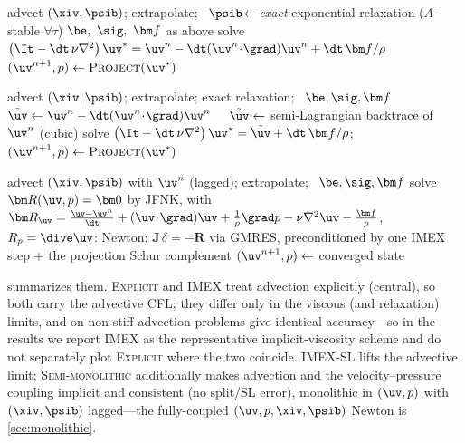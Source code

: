 \begin{algorithm}[t]\small\caption{\textsc{IMEX} --- implicit viscosity + exact relaxation}\label{alg:imex}
\begin{algorithmic}[1]
\State advect $(\xiv,\psib)$; extrapolate; \, $\psib\!\leftarrow\!$ \emph{exact} exponential relaxation ($A$-stable $\forall\tau$)
\State $\be,\ \sig,\ \bm f$ as above
\State solve $\left(\It-\dt\,\nu\nabla^2\right)\uv^{*}=\uv^n-\dt(\uv^n\!\cdot\!\grad)\uv^n+\dt\,\bm f/\rho$ 
\State $(\uv^{n+1},p)\leftarrow\textsc{Project}(\uv^{*})$
\end{algorithmic}
\end{algorithm}

\begin{algorithm}[t]\small\caption{\textsc{IMEX-SL} --- + semi-Lagrangian advection}\label{alg:imexsl}
\begin{algorithmic}[1]
\State advect $(\xiv,\psib)$; extrapolate; exact relaxation; \, $\be,\sig,\bm f$
 $\tilde{\uv}\leftarrow \uv^n-\dt(\uv^n\!\cdot\!\grad)\uv^n$ 
\Else\ \ $\tilde{\uv}\leftarrow$ semi-Lagrangian backtrace of $\uv^n$ (cubic) 
\EndIf
\State solve $\left(\It-\dt\,\nu\nabla^2\right)\uv^{*}=\tilde{\uv}+\dt\,\bm f/\rho$; \ $(\uv^{n+1},p)\leftarrow\textsc{Project}(\uv^{*})$
\end{algorithmic}
\end{algorithm}

\begin{algorithm}[t]\small\caption{\textsc{Semi-monolithic} --- Newton--Krylov velocity--pressure}\label{alg:mono}
\begin{algorithmic}[1]
\State advect $(\xiv,\psib)$ with $\uv^n$ (lagged); extrapolate; \, $\be,\sig,\bm f$
\State solve $\bm R(\uv,p)=\bm 0$ by JFNK, with
$\bm R_{\uv}=\tfrac{\uv-\uv^n}{\dt}+(\uv\!\cdot\!\grad)\uv+\tfrac1\rho\grad p-\nu\nabla^2\uv-\tfrac{\bm f}{\rho}$, $R_p=\dive\uv$:
\State \quad Newton: $\bm J\,\delta=-\bm R$ via GMRES, preconditioned by one \textsc{IMEX} step + the projection Schur complement
\State $(\uv^{n+1},p)\leftarrow$ converged state
\end{algorithmic}
\end{algorithm}

 summarizes them. \textsc{Explicit} and \textsc{IMEX} treat advection
explicitly (central), so both carry the advective CFL; they differ only in the viscous
(and relaxation) limits, and on non-stiff-advection problems give identical accuracy---so
in the results we report \textsc{IMEX} as the representative implicit-viscosity scheme and
do not separately plot \textsc{Explicit} where the two coincide. \textsc{IMEX-SL} lifts the
advective limit; \textsc{Semi-monolithic} additionally makes advection and the
velocity--pressure coupling implicit and consistent (no split/SL error), monolithic in
$(\uv,p)$ with $(\xiv,\psib)$ lagged---the fully-coupled $(\uv,p,\xiv,\psib)$ Newton is
\cref{sec:monolithic}.

